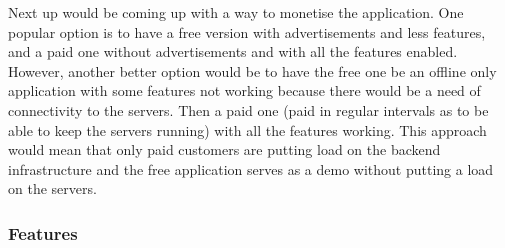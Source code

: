 \documentclass{article}
\newcommand{\vspaceconst}{-2ex}
\begin{document}
\begin{multicols}{2}
Next up would be coming up with a way to monetise the application. One popular option is to have a free version with advertisements and less features, and a paid one without advertisements and with all the features enabled. However, another better option would be to have the free one be an offline only application with some features not working because there would be a need of connectivity to the servers. Then a paid one (paid in regular intervals as to be able to keep the servers running) with all the features working. This approach would mean that only paid customers are putting load on the backend infrastructure and the free application serves as a demo without putting a load on the servers.\\

\subsubsection{Features}
\vspace{\vspaceconst}


\end{multicols}
\end{document}
